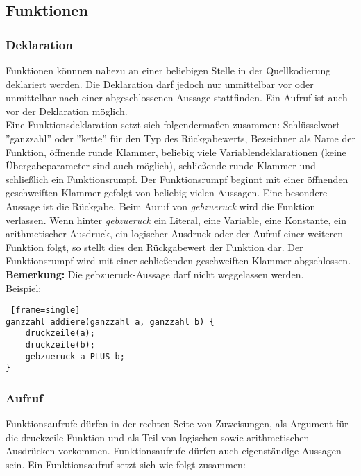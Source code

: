 \documentclass[12pt, a4paper, oneside, ngerman]{article}
\begin{document}
\subsection{Funktionen}

\subsubsection{Deklaration}
Funktionen könnnen nahezu an einer beliebigen Stelle in der Quellkodierung deklariert werden. 
Die Deklaration darf jedoch nur unmittelbar vor oder unmittelbar nach einer abgeschlossenen Aussage stattfinden.
Ein Aufruf ist auch vor der Deklaration möglich. \\

Eine Funktionsdeklaration setzt sich folgendermaßen zusammen:
Schlüsselwort ''ganzzahl'' oder ''kette'' für den Typ des Rückgabewerts, Bezeichner als Name der Funktion, öffnende runde Klammer, beliebig viele Variablendeklarationen (keine Übergabeparameter sind auch möglich), schließende runde Klammer und schließlich ein Funktionsrumpf.
Der Funktionsrumpf beginnt mit einer öffnenden geschweiften Klammer gefolgt von beliebig vielen Aussagen. 
Eine besondere Aussage ist die Rückgabe. Beim Auruf von \textit{gebzueruck} wird die Funktion verlassen. Wenn hinter \textit{gebzueruck} ein Literal, eine Variable, eine Konstante, ein arithmetischer Ausdruck, ein logischer Ausdruck oder der Aufruf einer weiteren Funktion folgt, so stellt dies den Rückgabewert der Funktion dar.
Der Funktionsrumpf wird mit einer schließenden geschweiften Klammer abgschlossen. \\

\medskip
\noindent
\textbf{Bemerkung:} Die gebzueruck-Aussage darf nicht weggelassen werden. \\

\medskip
\noindent
Beispiel:
\begin{lstlisting} [frame=single] 
ganzzahl addiere(ganzzahl a, ganzzahl b) {
	druckzeile(a);
	druckzeile(b);
	gebzueruck a PLUS b;
}
\end{lstlisting}

\subsubsection{Aufruf}
Funktionsaufrufe dürfen in der rechten Seite von Zuweisungen, als Argument für die druckzeile-Funktion und als Teil von logischen sowie arithmetischen Ausdrücken vorkommen. Funktionsaufrufe dürfen auch eigenständige Aussagen sein. Ein Funktionsaufruf setzt sich wie folgt zusammen:
\end{document}
